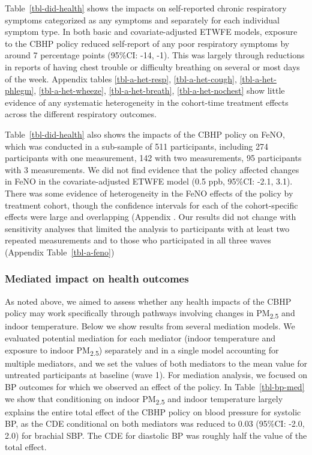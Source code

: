\documentclass[
  letterpaper,
  DIV=11,
  numbers=noendperiod]{scrartcl}
\begin{document}
Table~\ref{tbl-did-health} shows the impacts on self-reported chronic
respiratory symptoms categorized as any symptoms and separately for each
individual symptom type. In both basic and covariate-adjusted ETWFE
models, exposure to the CBHP policy reduced self-report of any poor
respiratory symptoms by around 7 percentage points (95\%CI: -14, -1).
This was largely through reductions in reports of having chest trouble
or difficulty breathing on several or most days of the week. Appendix
tables \ref{tbl-a-het-resp}, \ref{tbl-a-het-cough},
\ref{tbl-a-het-phlegm}, \ref{tbl-a-het-wheeze}, \ref{tbl-a-het-breath},
\ref{tbl-a-het-nochest} show little evidence of any systematic
heterogeneity in the cohort-time treatment effects across the different
respiratory outcomes.

Table~\ref{tbl-did-health} also shows the impacts of the CBHP policy on
FeNO, which was conducted in a sub-sample of 511 participants, including
274 participants with one measurement, 142 with two measurements, 95
participants with 3 measurements. We did not find evidence that the
policy affected changes in FeNO in the covariate-adjusted ETWFE model
(0.5 ppb, 95\%CI: -2.1, 3.1). There was some evidence of heterogeneity
in the FeNO effects of the policy by treatment cohort, though the
confidence intervals for each of the cohort-specific effects were large
and overlapping (Appendix . Our results did not change with sensitivity
analyses that limited the analysis to participants with at least two
repeated measurements and to those who participated in all three waves
(Appendix Table~\ref{tbl-a-feno})

\subsubsection{Mediated impact on health
outcomes}\label{mediated-impact-on-health-outcomes}

As noted above, we aimed to assess whether any health impacts of the
CBHP policy may work specifically through pathways involving changes in
PM\textsubscript{2.5} and indoor temperature. Below we show results from
several mediation models. We evaluated potential mediation for each
mediator (indoor temperature and exposure to indoor
PM\textsubscript{2.5}) separately and in a single model accounting for
multiple mediators, and we set the values of both mediators to the mean
value for untreated participants at baseline (wave 1). For mediation
analysis, we focused on BP outcomes for which we observed an effect of
the policy. In Table~\ref{tbl-bp-med} we show that conditioning on
indoor PM\textsubscript{2.5} and indoor temperature largely explains the
entire total effect of the CBHP policy on blood pressure for systolic
BP, as the CDE conditional on both mediators was reduced to 0.03
(95\%CI: -2.0, 2.0) for brachial SBP. The CDE for diastolic BP was
roughly half the value of the total effect.
\end{document}
